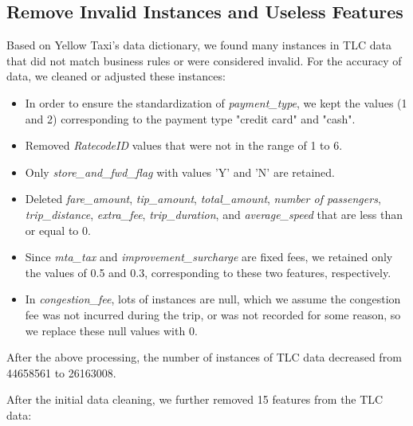 \documentclass[11pt]{article}
\begin{document}
\subsection{Remove Invalid Instances and Useless Features}
Based on Yellow Taxi's data dictionary\cite{TLC_data_dictionary}, we found many instances in TLC data that did not match business rules or were considered invalid. For the accuracy of data, we cleaned or adjusted these instances:

\begin{itemize}
    \item In order to ensure the standardization of \textit{payment\_type}, we kept the values (1 and 2) corresponding to the payment type "credit card" and "cash". 
    \item Removed \textit{RatecodeID} values that were not in the range of 1 to 6.
    \item Only \textit{store\_and\_fwd\_flag} with values 'Y' and 'N' are retained.
    \item Deleted \textit{fare\_amount}, \textit{tip\_amount}, \textit{total\_amount}, \textit{number of passengers}, \textit{trip\_distance}, \textit{extra\_fee}, \textit{trip\_duration}, and \textit{average\_speed} that are less than or equal to 0.
    \item Since \textit{mta\_tax} and \textit{improvement\_surcharge} are fixed fees, we retained only the values of 0.5 and 0.3, corresponding to these two features, respectively.
    \item In \textit{congestion\_fee}, lots of instances are null, which we assume the congestion fee was not incurred during the trip, or was not recorded for some reason, so we replace these null values with 0.
\end{itemize}

After the above processing, the number of instances of TLC data decreased from 44658561 to 26163008.

After the initial data cleaning, we further removed 15 features from the TLC data:
\end{document}
